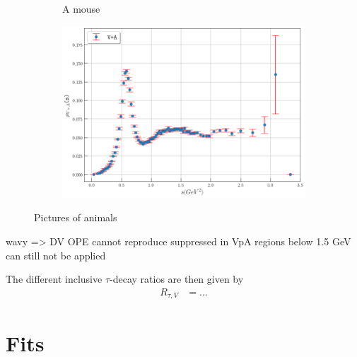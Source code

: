 \documentclass[../../index.tex]{subfiles}
\begin{document}
\begin{figure}
\begin{subfigure}[b]{0.49\textwidth}
        \caption{A mouse}
        \label{fig:mouse}
    \end{subfigure}
    \begin{subfigure}[b]{0.8\textwidth}
      \centering
      \includegraphics[width=\textwidth]{./images/specFuncAleph_VpA.png}
      \label{fig:}
    \end{subfigure}
    \caption{Pictures of animals}\label{fig:animals}
\end{figure}

wavy => DV
OPE cannot reproduce
suppressed in VpA
regions below 1.5 GeV can still not be applied

The different inclusive $\tau$-decay ratios are then given by
\begin{align}
  R_{\tau,V} &= ...
\end{align}

\section{Fits}
\end{document}
